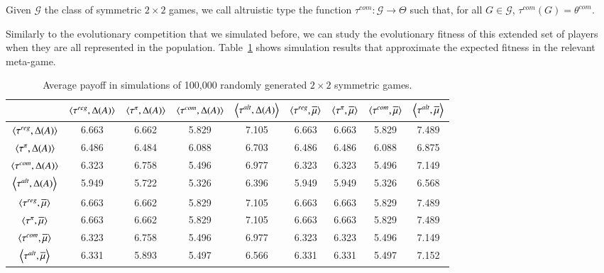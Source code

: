 \documentclass[fleqn,reqno,11pt]{article}
\begin{document}
\begin{definition} \label{defn:comtype}

Given $ \mathcal{G} $ the class of symmetric $ 2 \times 2 $ games, we call altruistic type the function $\tau^{com}: \mathcal{G} \rightarrow  \Theta$ such that, for all $G \in \mathcal{G}$, $ \tau^{com}(G)= \theta^{com}$.

\end{definition}

Similarly to the evolutionary competition that we simulated before, we can study the
evolutionary fitness of this extended set of players when they are all represented in the
population. Table~\ref{tab:ExpectedFitness_2x2_Full} shows simulation results that approximate the
expected fitness in the relevant meta-game.

\begin{table}[]
\centering
\footnotesize
\begin{tabular}{ccccccccc}
  \hline
 & $\left \langle \tau^{reg}, \Delta(A)\right\rangle$ 
 & $\left \langle \tau^{\pi}, \Delta(A)\right\rangle$ 
 & $\left \langle \tau^{com}, \Delta(A)\right\rangle$
 & $\left \langle \tau^{alt}, \Delta(A)\right\rangle$
 & $\left \langle \tau^{reg}, \overline{\mu}\right\rangle$ 
 & $\left \langle \tau^{\pi}, \overline{\mu}\right\rangle$ 
 & $\left \langle \tau^{com}, \overline{\mu}\right\rangle$
 & $\left \langle \tau^{alt}, \overline{\mu}\right\rangle$ \\ 
  \hline
  $\left \langle \tau^{reg}, \Delta(A)\right\rangle$ & 6.663 & 6.662 & 5.829 & 7.105 & 6.663 & 6.663 & 5.829 & 7.489 \\
  $\left \langle \tau^{\pi}, \Delta(A)\right\rangle$ & 6.486 & 6.484 & 6.088 & 6.703 & 6.486 & 6.486 & 6.088 & 6.875 \\
  $\left \langle \tau^{com}, \Delta(A)\right\rangle$ & 6.323 & 6.758 & 5.496 & 6.977 & 6.323 & 6.323 & 5.496 & 7.149 \\
  $\left \langle \tau^{alt}, \Delta(A)\right\rangle$ & 5.949 & 5.722 & 5.326 & 6.396 & 5.949 & 5.949 & 5.326 & 6.568 \\
  $\left \langle \tau^{reg}, \overline{\mu}\right\rangle$ & 6.663 & 6.662 & 5.829 & 7.105 & 6.663 & 6.663 & 5.829 & 7.489 \\
  $\left \langle \tau^{\pi}, \overline{\mu}\right\rangle$ & 6.663 & 6.662 & 5.829 & 7.105 & 6.663 & 6.663 & 5.829 & 7.489 \\
  $\left \langle \tau^{com}, \overline{\mu}\right\rangle$ & 6.323 & 6.758 & 5.496 & 6.977 & 6.323 & 6.323 & 5.496 & 7.149 \\
  $\left \langle \tau^{alt}, \overline{\mu}\right\rangle$ & 6.331 & 5.893 & 5.497 & 6.566 & 6.331 & 6.331 & 5.497 & 7.152 \\
   \hline                          
\end{tabular}                      
\caption{Average payoff in simulations of 100,000
  randomly generated $2 \times 2$ symmetric games.}
\label{tab:ExpectedFitness_2x2_Full}        
\end{table}   
 
\end{document}
